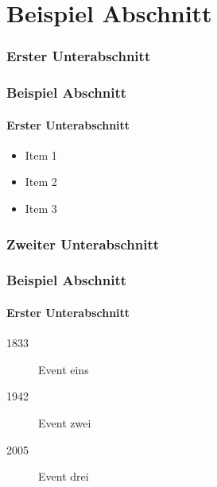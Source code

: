 \section{Beispiel Abschnitt}
\subsubsection{Erster Unterabschnitt}
\begin{frame}
    \frametitle{Beispiel Abschnitt}
    \framesubtitle{Erster Unterabschnitt}

    \begin{itemize}
        \item Item 1
        \item Item 2
        \item Item 3
    \end{itemize}
\end{frame}

\subsubsection{Zweiter Unterabschnitt}
\begin{frame}
    \frametitle{Beispiel Abschnitt}
    \framesubtitle{Erster Unterabschnitt}

    \begin{description}
        \item[1833] Event eins
        \item[1942] Event zwei
        \item[2005] Event drei
    \end{description}
\end{frame}
